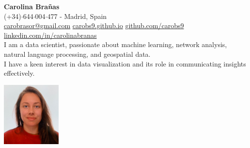 \documentclass{resume}
\begin{document}
\vspace{-2em}
\begin{minipage}{0.75\textwidth}
    \raggedright
    {\Huge \textbf{Carolina Brañas}}\\[0.5em] 
    {\small
    (+34)$\cdot$644$\cdot$004$\cdot$477 - Madrid, Spain\\
    \href{mailto://carobrasor@gmail.com}{carobrasor@gmail.com} \quad
    \href{https://carobs9.github.io/}{carobs9.github.io} \quad
    \href{https://github.com/carobs9}{github.com/carobs9} \quad
    \href{https://www.linkedin.com/in/carolinabranas/}{linkedin.com/in/carolinabranas} \quad
    }\\[1em]
    I am a data scientist, passionate about machine learning, network analysis, natural language processing, and geospatial data. \\
    I have a keen interest in data visualization and its role in communicating insights effectively.
\end{minipage}%
\hfill
\begin{minipage}{0.23\textwidth}
    \begin{flushright}
        \includegraphics[width=3cm]{profile.jpg}
    \end{flushright}
\end{minipage}
\vspace{1em}

\end{document}
